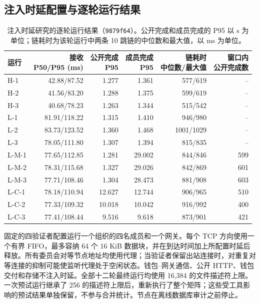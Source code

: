\subsection{注入时延配置与逐轮运行结果}
\begin{table}[t]
  \caption{注入时延研究的逐轮运行结果（\texttt{9879f64}）。公开完成和成员完成的 P95 以 s 为单位；链耗时为该轮运行中两条 10 跳链的中位数和最大值，以 ms 为单位。}
  \label{tab:supp-faults}
  \centering
  \small
  \setlength{\tabcolsep}{3.5pt}
  \begin{tabular}{@{}lrrrrr@{}}
    \toprule
    运行 & \shortstack{接收\\P50/P95 (ms)} & \shortstack{公开完成\\P95} & \shortstack{成员完成\\P95} & \shortstack{链耗时\\中位数/最大值} & \shortstack{窗口内\\公开完成数} \\
    \midrule
    H-1   & 42.88/87.52 & 1.277  & 1.361  & 577/619  & -- \\
    H-2   & 41.56/83.20 & 1.288  & 1.375  & 599/619  & -- \\
    H-3   & 40.68/78.23 & 1.263  & 1.344  & 515/542  & -- \\
    L-1   & 81.91/118.22 & 1.315 & 1.410  & 946/980  & -- \\
    L-2   & 83.73/123.52 & 1.360 & 1.468  & 1001/1029 & -- \\
    L-3   & 78.05/111.80 & 1.307 & 1.394  & 815/835  & -- \\
    L-M-1 & 77.65/112.85 & 1.281 & 29.002 & 844/846  & 599 \\
    L-M-2 & 78.31/115.68 & 1.327 & 29.026 & 842/869  & 601 \\
    L-M-3 & 77.71/108.46 & 1.304 & 28.473 & 881/908  & 603 \\
    L-C-1 & 78.18/110.94 & 12.627 & 12.744 & 906/965 & 510 \\
    L-C-2 & 77.33/109.32 & 10.018 & 10.042 & 916/992 & 400 \\
    L-C-3 & 77.41/108.44 & 9.516  & 9.618  & 873/901 & 421 \\
    \bottomrule
  \end{tabular}
\end{table}
固定的四验证者配置运行一个组织的四名成员和一个网关。每个 TCP 方向使用一个有界 FIFO，最多容纳 64 个 16 KiB 数据块，并在到达时间加上所配置时延后释放。所有委员会对等节点地址均使用代理；当验证者保留出站连接时，对重复对等连接的抑制可能使监听代理处于空闲状态。钱包--网关通信、公开 HTTP、钱包交付和存储不注入时延。全部十二轮最终运行均使用 16,384 的文件描述符上限。一次预试运行继承了 256 的描述符上限后，重新执行了整个矩阵；这些受工具影响的预试结果单独保留，不参与合并统计。节点在离线数据库审计之前停止。

